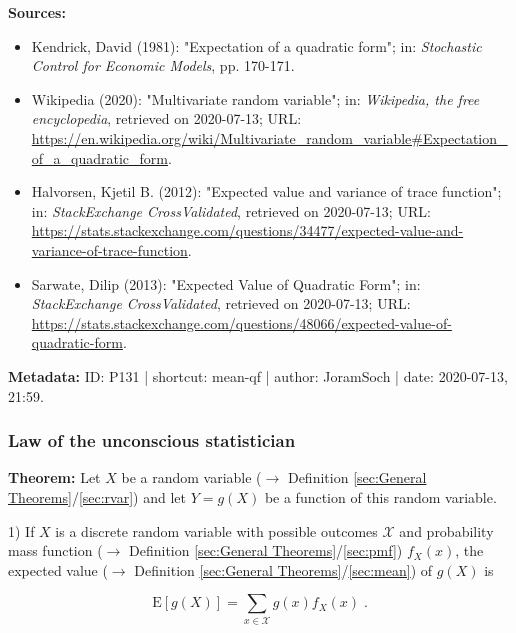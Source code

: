 \documentclass[a4paper,12pt,twoside]{book}
\begin{document}
\vspace{1em}
\textbf{Sources:}
\begin{itemize}
\item Kendrick, David (1981): "Expectation of a quadratic form"; in: \textit{Stochastic Control for Economic Models}, pp. 170-171.
\item Wikipedia (2020): "Multivariate random variable"; in: \textit{Wikipedia, the free encyclopedia}, retrieved on 2020-07-13; URL: \url{https://en.wikipedia.org/wiki/Multivariate_random_variable#Expectation_of_a_quadratic_form}.
\item Halvorsen, Kjetil B. (2012): "Expected value and variance of trace function"; in: \textit{StackExchange CrossValidated}, retrieved on 2020-07-13; URL: \url{https://stats.stackexchange.com/questions/34477/expected-value-and-variance-of-trace-function}.
\item Sarwate, Dilip (2013): "Expected Value of Quadratic Form"; in: \textit{StackExchange CrossValidated}, retrieved on 2020-07-13; URL: \url{https://stats.stackexchange.com/questions/48066/expected-value-of-quadratic-form}.
\end{itemize}


\vspace{1em}
\textbf{Metadata:} ID: P131 | shortcut: mean-qf | author: JoramSoch | date: 2020-07-13, 21:59.
\vspace{1em}



\subsubsection[\textbf{Law of the unconscious statistician}]{Law of the unconscious statistician} \label{sec:mean-lotus}
\setcounter{equation}{0}

\textbf{Theorem:} Let $X$ be a random variable ($\rightarrow$ Definition \ref{sec:General Theorems}/\ref{sec:rvar}) and let $Y = g(X)$ be a function of this random variable.

1) If $X$ is a discrete random variable with possible outcomes $\mathcal{X}$ and probability mass function ($\rightarrow$ Definition \ref{sec:General Theorems}/\ref{sec:pmf}) $f_X(x)$, the expected value ($\rightarrow$ Definition \ref{sec:General Theorems}/\ref{sec:mean}) of $g(X)$ is

\begin{equation} \label{eq:mean-lotus-mean-lotus-disc}
\mathrm{E}[g(X)] = \sum_{x \in \mathcal{X}} g(x) f_X(x) \; .
\end{equation}
\end{document}
